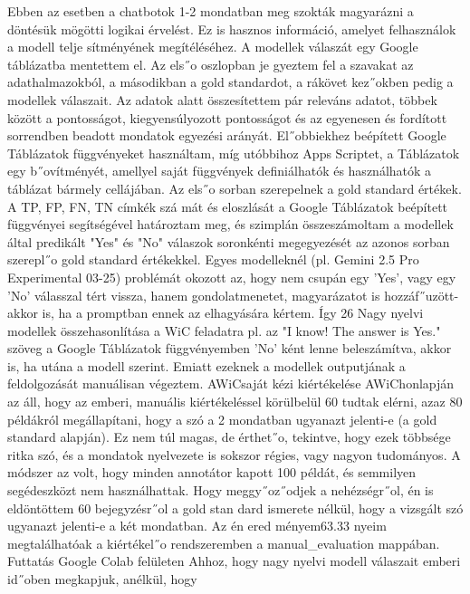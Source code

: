 \documentclass[12pt]{report}
\theoremstyle{definition}
\begin{document}
 Ebben az esetben a chatbotok 1-2 mondatban meg szokták magyarázni a döntésük
 mögötti logikai érvelést. Ez is hasznos információ, amelyet felhasználok a modell telje
sítményének megítéléséhez.
 A modellek válaszát egy Google táblázatba mentettem el. Az els˝o oszlopban je
gyeztem fel a szavakat az adathalmazokból, a másodikban a gold standardot, a rákövet
kez˝okben pedig a modellek válaszait. Az adatok alatt összesítettem pár releváns adatot,
 többek között a pontosságot, kiegyensúlyozott pontosságot és az egyenesen és fordított
 sorrendben beadott mondatok egyezési arányát. El˝obbiekhez beépített Google Táblázatok
 függvényeket használtam, míg utóbbihoz Apps Scriptet, a Táblázatok egy b˝ovítményét,
 amellyel saját függvények definiálhatók és használhatók a táblázat bármely cellájában.
 Az els˝o sorban szerepelnek a gold standard értékek. A TP, FP, FN, TN címkék szá
mát és eloszlását a Google Táblázatok beépített függvényei segítségével határoztam meg,
 és szimplán összeszámoltam a modellek által predikált "Yes" és "No" válaszok soronkénti
 megegyezését az azonos sorban szerepl˝o gold standard értékekkel.
 Egyes modelleknél (pl. Gemini 2.5 Pro Experimental 03-25) problémát okozott az,
 hogy nem csupán egy ’Yes’, vagy egy ’No’ válasszal tért vissza, hanem gondolatmenetet,
 magyarázatot is hozzáf˝uzött- akkor is, ha a promptban ennek az elhagyására kértem. Így
 26
Nagy nyelvi modellek összehasonlítása a WiC feladatra
 pl. az "I know! The answer is Yes." szöveg a Google Táblázatok függvényemben ’No’
ként lenne beleszámítva, akkor is, ha utána a modell szerint. Emiatt ezeknek a modellek
 outputjának a feldolgozását manuálisan végeztem.
 AWiCsaját kézi kiértékelése
 AWiChonlapján az áll, hogy az emberi, manuális kiértékeléssel körülbelül 60%
 tudtak elérni, azaz 80%
 példákról megállapítani, hogy a szó a 2 mondatban ugyanazt jelenti-e (a gold standard
 alapján). Ez nem túl magas, de érthet˝o, tekintve, hogy ezek többsége ritka szó, és a
 mondatok nyelvezete is sokszor régies, vagy nagyon tudományos. A módszer az volt,
 hogy minden annotátor kapott 100 példát, és semmilyen segédeszközt nem használhattak.
 Hogy meggy˝oz˝odjek a nehézségr˝ol, én is eldöntöttem 60 bejegyzésr˝ol a gold stan
dard ismerete nélkül, hogy a vizsgált szó ugyanazt jelenti-e a két mondatban. Az én ered
ményem63.33%
nyeim megtalálhatóak a kiértékel˝o rendszeremben a manual_evaluation mappában.
 Futtatás Google Colab felületen
 Ahhoz, hogy nagy nyelvi modell válaszait emberi id˝oben megkapjuk, anélkül, hogy
\end{document}
